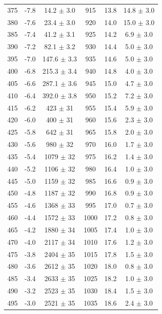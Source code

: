 \documentclass[a4paper,12pt]{article}
\begin{document}
\begin{center}
\begin{longtable}{|c|c|c||c|c|c|}
375 & -7.8 & 14.2 $\pm$  3.0   & 915 & 13.8 & 14.8 $\pm$  3.0  \\
380 & -7.6 & 23.4 $\pm$  3.0   & 920 & 14.0 & 15.0 $\pm$  3.0  \\
385 & -7.4 & 41.2 $\pm$  3.1   & 925 & 14.2 & 6.9 $\pm$  3.0  \\
390 & -7.2 & 82.1 $\pm$  3.2   & 930 & 14.4 & 5.0 $\pm$  3.0  \\
395 & -7.0 & 147.6 $\pm$  3.3   & 935 & 14.6 & 5.0 $\pm$  3.0  \\
400 & -6.8 & 215.3 $\pm$  3.4   & 940 & 14.8 & 4.0 $\pm$  3.0  \\
405 & -6.6 & 287.1 $\pm$  3.6   & 945 & 15.0 & 4.7 $\pm$  3.0  \\
410 & -6.4 & 392.0 $\pm$  3.8   & 950 & 15.2 & 7.2 $\pm$  3.0  \\
415 & -6.2 & 423 $\pm$  31   & 955 & 15.4 & 5.9 $\pm$  3.0  \\
420 & -6.0 & 400 $\pm$  31   & 960 & 15.6 & 2.3 $\pm$  3.0  \\
425 & -5.8 & 642 $\pm$  31   & 965 & 15.8 & 2.0 $\pm$  3.0  \\
430 & -5.6 & 980 $\pm$  32   & 970 & 16.0 & 1.7 $\pm$  3.0  \\
435 & -5.4 & 1079 $\pm$  32   & 975 & 16.2 & 1.4 $\pm$  3.0  \\
440 & -5.2 & 1106 $\pm$  32   & 980 & 16.4 & 1.0 $\pm$  3.0  \\
445 & -5.0 & 1159 $\pm$  32   & 985 & 16.6 & 0.9 $\pm$  3.0  \\
450 & -4.8 & 1187 $\pm$  32   & 990 & 16.8 & 0.9 $\pm$  3.0  \\
455 & -4.6 & 1368 $\pm$  33   & 995 & 17.0 & 0.7 $\pm$  3.0  \\
460 & -4.4 & 1572 $\pm$  33   & 1000 & 17.2 & 0.8 $\pm$  3.0  \\
465 & -4.2 & 1880 $\pm$  34   & 1005 & 17.4 & 1.0 $\pm$  3.0  \\
470 & -4.0 & 2117 $\pm$  34   & 1010 & 17.6 & 1.2 $\pm$  3.0  \\
475 & -3.8 & 2404 $\pm$  35   & 1015 & 17.8 & 1.5 $\pm$  3.0  \\
480 & -3.6 & 2612 $\pm$  35   & 1020 & 18.0 & 0.8 $\pm$  3.0  \\
485 & -3.4 & 2633 $\pm$  35   & 1025 & 18.2 & 1.0 $\pm$  3.0  \\
490 & -3.2 & 2523 $\pm$  35   & 1030 & 18.4 & 1.5 $\pm$  3.0  \\
495 & -3.0 & 2521 $\pm$  35   & 1035 & 18.6 & 2.4 $\pm$  3.0  \\

\end{longtable}
\end{center}
\end{document}
